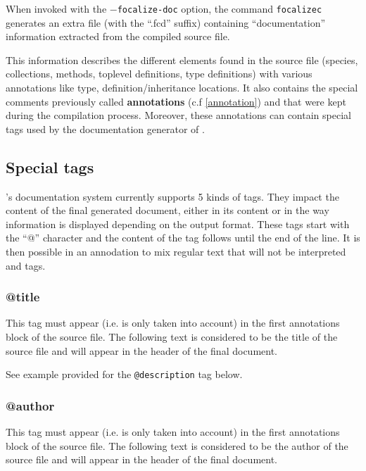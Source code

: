\label{documentation-generation}
When invoked with the {\tt $-$focalize-doc} option, the command
{\tt focalizec} generates an extra file (with the ``.fcd'' suffix)
containing ``documentation'' information extracted from the compiled
source file.

This information describes the different elements found in the source
file (species, collections, methods, toplevel definitions, type
definitions) with various annotations like type,
definition/inheritance locations. It also contains the special comments
previously called {\bf annotations} (c.f \ref{annotation}) and that
were kept during the compilation process. Moreover, these annotations
can contain special tags used by the documentation generator of
\focal.



\subsection{Special tags}
\focal's documentation system currently supports 5 kinds of
tags. They impact the content of the final generated document,
either in its content or in the way information is displayed depending
on the output format. These tags start with the ``@'' character and
the content of the tag follows until the end of the line. It is then
possible in an annodation to mix regular text that will not be
interpreted and tags.

\subsubsection{@title}
This tag must appear (i.e. is only taken into account) in the first
annotations block of the source file. The following text is considered
to be the title of the source file and will appear in the header of
the final document.

See example provided for the {\tt @description} tag below.



\subsubsection{@author}
This tag must appear (i.e. is only taken into account) in the first
annotations block of the source file. The following text is considered
to be the author of the source file and will appear in the header of
the final document.

